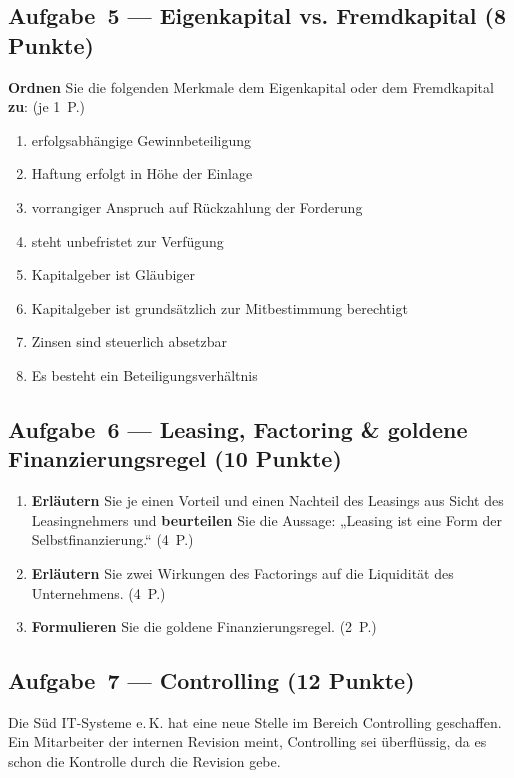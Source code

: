 \documentclass[11pt, a4paper]{article}
\begin{document}
\subsection*{Aufgabe~5 --- Eigenkapital vs. Fremdkapital (8 Punkte)}

\textbf{Ordnen} Sie die folgenden Merkmale dem Eigenkapital oder dem Fremdkapital
\textbf{zu}: \hfill (je 1~P.)

\begin{enumerate}[label=(\alph*)]
  \item erfolgsabhängige Gewinnbeteiligung
  \item Haftung erfolgt in Höhe der Einlage
  \item vorrangiger Anspruch auf Rückzahlung der Forderung
  \item steht unbefristet zur Verfügung
  \item Kapitalgeber ist Gläubiger
  \item Kapitalgeber ist grundsätzlich zur Mitbestimmung berechtigt
  \item Zinsen sind steuerlich absetzbar
  \item Es besteht ein Beteiligungsverhältnis
\end{enumerate}

\subsection*{Aufgabe~6 --- Leasing, Factoring \& goldene Finanzierungsregel (10 Punkte)}

\begin{enumerate}[label=(\alph*)]
  \item \textbf{Erläutern} Sie je einen Vorteil und einen Nachteil des Leasings aus Sicht
    des Leasingnehmers und \textbf{beurteilen} Sie die Aussage: „Leasing ist eine Form der
    Selbstfinanzierung.`` \hfill (4~P.)
  \item \textbf{Erläutern} Sie zwei Wirkungen des Factorings auf die Liquidität des
    Unternehmens. \hfill (4~P.)
  \item \textbf{Formulieren} Sie die goldene Finanzierungsregel. \hfill (2~P.)
\end{enumerate}

\subsection*{Aufgabe~7 --- Controlling (12 Punkte)}

Die Süd IT-Systeme e.\,K. hat eine neue Stelle im Bereich Controlling geschaffen. Ein
Mitarbeiter der internen Revision meint, Controlling sei überflüssig, da es schon die
Kontrolle durch die Revision gebe.
\end{document}
